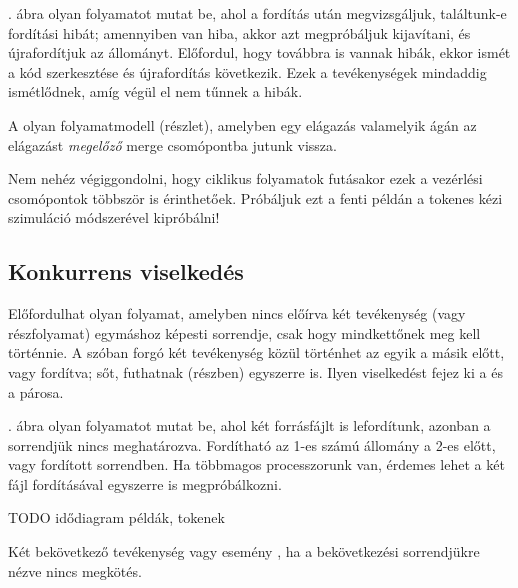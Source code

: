 \begin{pelda}
. ábra olyan folyamatot mutat be, ahol a fordítás után megvizsgáljuk, találtunk-e fordítási hibát; amennyiben van hiba, akkor azt megpróbáljuk kijavítani, és újrafordítjuk az állományt. Előfordul, hogy továbbra is vannak hibák, ekkor ismét a kód szerkesztése és újrafordítás következik. Ezek a tevékenységek mindaddig ismétlődnek, amíg végül el nem tűnnek a hibák.
\end{pelda}


\begin{definicio}
	A  olyan folyamatmodell (részlet), amelyben egy elágazás valamelyik ágán az elágazást \emph{megelőző} merge csomópontba jutunk vissza.
\end{definicio} 
Nem nehéz végiggondolni, hogy ciklikus folyamatok futásakor ezek a vezérlési csomópontok többször is érinthetőek. Próbáljuk ezt a fenti példán a tokenes kézi szimuláció módszerével kipróbálni!

\subsection{Konkurrens viselkedés}
Előfordulhat olyan folyamat, amelyben nincs előírva két tevékenység (vagy részfolyamat) egymáshoz képesti sorrendje, csak hogy mindkettőnek meg kell történnie. A szóban forgó két tevékenység közül történhet az egyik a másik előtt, vagy fordítva; sőt, futhatnak (részben) egyszerre is. Ilyen viselkedést fejez ki a  és a  párosa.

\begin{pelda}
. ábra olyan folyamatot mutat be, ahol két forrásfájlt is lefordítunk, azonban a sorrendjük nincs meghatározva. Fordítható az 1-es számú állomány a 2-es előtt, vagy fordított sorrendben. Ha többmagos processzorunk van, érdemes lehet a két fájl fordításával egyszerre is megpróbálkozni.
\end{pelda}


TODO idődiagram példák, tokenek

\begin{definicio}
Két bekövetkező tevékenység vagy esemény , ha a bekövetkezési sorrendjükre nézve nincs megkötés.
\end{definicio} 


